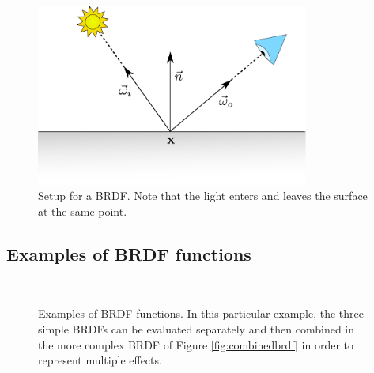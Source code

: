 \begin{figure}[!ht]
\centering
\includegraphics[width=0.8\textwidth]{images/brdf.pdf}
\caption{Setup for a BRDF. Note that the light enters and leaves the surface at the same point.}
\label{fig:brdf}
\end{figure}

\FloatBarrier 
\subsection{Examples of BRDF functions}
\begin{figure}
\centering
{}
 \\
\label{fig:brdfexamples}
\caption{Examples of BRDF functions. In this particular example, the three simple BRDFs can be evaluated separately and then combined in the more complex BRDF of Figure \ref{fig:combinedbrdf} in order to represent multiple effects.}
\end{figure}

